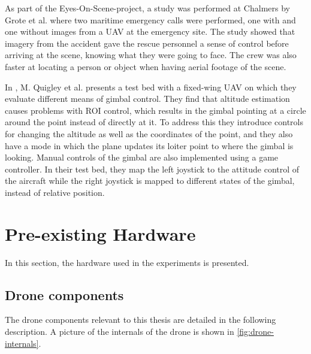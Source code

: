 \documentclass[nofilelist]{cslthse-msc}
\begin{document}
As part of the Eyes-On-Scene-project, a study was performed at Chalmers by Grote et al. \cite{eos-maritime} where two maritime emergency calls were performed, one with and one without images from a UAV at the emergency site. The study showed that imagery from the accident gave the rescue personnel a sense of control before arriving at the scene, knowing what they were going to face. The crew was also faster at locating a person or object when having aerial footage of the scene.

In \cite{targetting}, M. Quigley et al. presents a test bed with a fixed-wing UAV on which they evaluate different means of gimbal control. They find that altitude estimation causes problems with ROI control, which results in the gimbal pointing at a circle around the point instead of directly at it. To address this they introduce controls for changing the altitude as well as the coordinates of the point, and they also have a mode in which the plane updates its loiter point to where the gimbal is looking. Manual controls of the gimbal are also implemented using a game controller. In their test bed, they map the left joystick to the attitude control of the aircraft while the right joystick is mapped to different states of the gimbal, instead of relative position.

\section{Pre-existing Hardware}
In this section, the hardware used in the experiments is presented.

\subsection{Drone components}
\label{sec:uav-components}
The drone components relevant to this thesis are detailed in the following description. A picture of the internals of the drone is shown in \ref{fig:drone-internals}.
\end{document}
